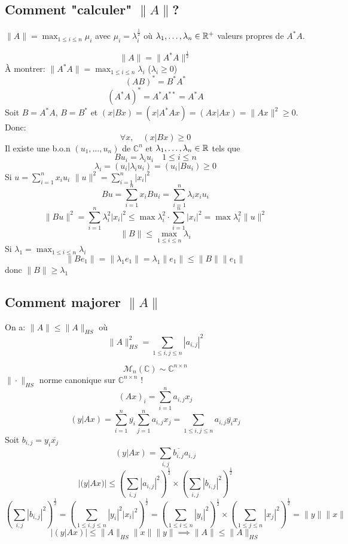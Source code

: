  \subsection{Comment "calculer" $\|A\|$?}
 \begin{theorem}
     $\|A\| = \max_{1 \le i \le n} \mu_i$ avec $\mu_i = \lambda_i^{\frac{1}{2}}$ où $\lambda_1, \ldots, \lambda_n \in \mathbb{R}^+$ valeurs propres de $A^*A$.
 \end{theorem}
 \begin{preuve}
    \[
        \|A\| = \|A^*A\|^{\frac{1}{2}}
    \]  
    À montrer: $\|A^*A\| = \max_{1 \le i \le n} \lambda_i$ ($\lambda_i \ge 0$)
    \[
        (AB)^* = B^*A^*
    \] 
    \[
        (A^*A)^* = A^*A^{* *} = A^*A
    \] 
    Soit $B = A^*A$,  $B = B^*$ et  $(x|Bx) = (x|A^*Ax) = (Ax|Ax) = \|Ax\|^2 \ge 0$. Donc:
    \[
    \forall x, \quad (x|Bx) \ge 0
    \] 
    Il existe une b.o.n $(u_1, \ldots, u_n)$ de $\mathbb{C}^n$ et  $\lambda_1, \ldots, \lambda_n \in \mathbb{R}$ tels que 
    \[
    Bu_i = \lambda_iu_i \quad 1\le i \le n
    \] 
    \[
        \lambda_i = (u_i|\lambda_iu_i) = (u_i|Bu_i) \ge 0 
    \] 
    Si $u = \sum_{i=1}^{n} x_iu_i$ $\|u\|^2 = \sum_{i=1}^{n} |x_i|^2$ 
    \[
    Bu = \sum_{i=1}^{n} x_iBu_i = \sum_{i=1}^{n} \lambda_ix_iu_i
    \] 
    \[
    \|Bu\|^2 = \sum_{i=1}^{n} \lambda_i^2|x_i|^2 \le \max \lambda_i^2 \cdot \sum_{i=1}^{n} |x_i|^2 = \max \lambda_i^2 \|u\|^2
    \] 
    \[
    \|B\| \le \max_{1 \le i \le n} \lambda_i
    \] 
    Si $\lambda_1 = \max_{1 \le i \le n} \lambda_i$
    \[
    \|Be_1\| = \|\lambda_1e_1\| = \lambda_1\|e_1\| \le \|B\|\|e_1\|
    \] 
    donc $\|B\| \ge \lambda_1$
 \end{preuve}
 \subsection{Comment majorer $\|A\|$}
 \begin{prop}
    On a: $\|A\| \le \|A\|_{HS}$ où
    \[
    \|A\|_{HS}^2 = \sum_{1\le i,j\le n}^{} |a_{i,j}|^2
    \] 
 \end{prop}
 \begin{preuve}
     
    \[
        \mathcal{M}_n(\mathbb{C}) \sim \mathbb{C}^{n \times n}
    \] 
    $\| \cdot \|_{HS}$ norme canonique sur $\mathbb{C}^{n \times n}$ !
    \[
        (Ax)_{i} = \sum_{i=1}^{n} a_{i, j}x_j
    \] 
    \[
        (y|Ax) = \sum_{i=1}^{n} \overline{y_i}\sum_{j=1}^{n} a_{i,j}x_j = \sum_{1 \le i,j \le n}^{} a_{i, j}\overline{y_i}x_{j}
    \] 
    Soit $b_{i, j} = y_i \overline{x_j}$ 
    \[
        (y|Ax) = \sum_{i,j}^{} \overline{b_{i,j}}a_{i,j}
    \] 
    \[
        |(y|Ax)| \le \left( \sum_{i,j}^{} |a_{i,j}|^2 \right)^{\frac{1}{2}} \times \left( \sum_{i,j}^{} |b_{i,j}|^2 \right)^{\frac{1}{2}}
    \] 
    \[
        \left( \sum_{i,j}^{} |b_{i,j}|^2 \right)^{\frac{1}{2}} = \left( \sum_{1\le i,j \le n}^{} |y_i|^2 |x_i|^2 \right)^{\frac{1}{2}} = \left( \sum_{1\le i \le n}^{} |y_i|^2 \right)^{\frac{1}{2}} \times \left( \sum_{1 \le j \le n}^{} |x_j|^2 \right)^{\frac{1}{2}} = \|y\| \|x\|
    \] 
    \[
    \left| (y|Ax) \right| \le \|A\|_{HS} \|x\| \|y\| \implies \|A\| \le \|A\|_{HS}
    \] 
 \end{preuve}
